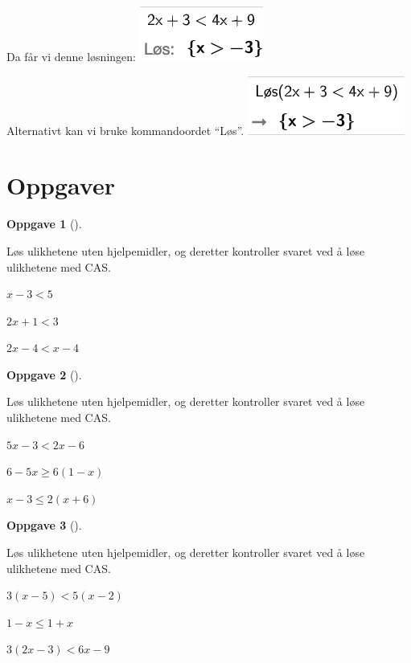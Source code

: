 \documentclass[
  letterpaper,
  DIV=11,
  numbers=noendperiod]{scrartcl}
\theoremstyle{definition}
\theoremstyle{definition}
\newtheorem{exercise}{Oppgave}[section]
\theoremstyle{remark}
\begin{document}
Da får vi denne løsningen:
\includegraphics{Ulikheter_files/figure-pdf/64440c9a-ee8e-4d8d-848c-75a06c2fa970-3-9cbd829e-255c-49c5-83dc-df78e7bb2c7d.png}

Alternativt kan vi bruke kommandoordet ``Løs''.
\includegraphics{Ulikheter_files/figure-pdf/64440c9a-ee8e-4d8d-848c-75a06c2fa970-2-8fbf58b9-721b-43b2-b963-4cb26026985a.png}

\hypertarget{oppgaver}{%
\section{Oppgaver}\label{oppgaver}}

\begin{exercise}[]\protect\hypertarget{exr-linulikhetOppgave1}{}\label{exr-linulikhetOppgave1}

Løs ulikhetene uten hjelpemidler, og deretter kontroller svaret ved å
løse ulikhetene med CAS.

\(x-3<5\)

\(2x+1<3\)

\(2x-4<x-4\)

\end{exercise}

\begin{exercise}[]\protect\hypertarget{exr-linulikhetOppgave2}{}\label{exr-linulikhetOppgave2}

Løs ulikhetene uten hjelpemidler, og deretter kontroller svaret ved å
løse ulikhetene med CAS.

\(5x-3<2x-6\)

\(6-5x\geq 6(1-x)\)

\(x-3\leq2(x+6)\)

\end{exercise}

\begin{exercise}[]\protect\hypertarget{exr-linulikhetOppgave3}{}\label{exr-linulikhetOppgave3}

Løs ulikhetene uten hjelpemidler, og deretter kontroller svaret ved å
løse ulikhetene med CAS.

\(3(x-5)<5(x-2)\)

\(1-x\leq 1+x\)

\(3(2x-3)<6x-9\)

\end{exercise}
\end{document}
